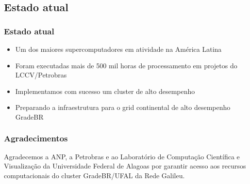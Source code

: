 \documentclass[10pt]{beamer}
\begin{document}
	\subsection{Estado atual}
	\begin{frame}
	\frametitle{Estado atual}
		\begin{itemize}[<+->]
			\item Um dos maiores supercomputadores em atividade na América Latina
			\item Foram executadas mais de 500 mil horas de processamento em projetos do LCCV/Petrobras
			\item Implementamos com sucesso um cluster de alto desempenho
			\item Preparando a infraestrutura para o grid continental de alto desempenho GradeBR
		\end{itemize}
	\end{frame}

	\begin{frame}
	\frametitle{Agradecimentos}
		\begin{block}{}%
			Agradecemos a ANP, a Petrobras e ao Laboratório de Computação Científica e Visualização da Universidade Federal de Alagoas por garantir acesso aos recursos computacionais do cluster GradeBR/UFAL da Rede Galileu.
		\end{block}
	\end{frame}
\end{document}

